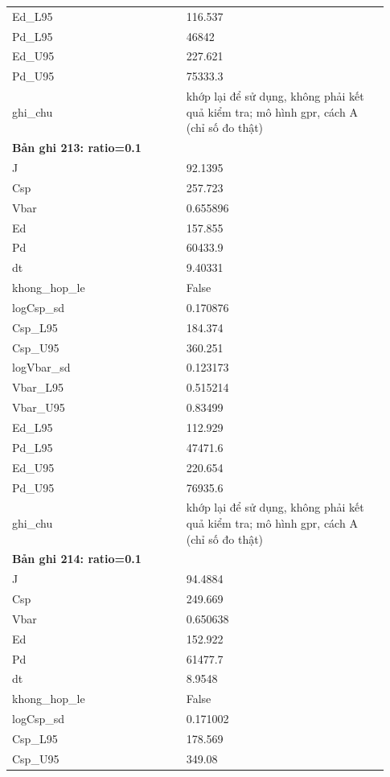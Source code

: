 \begin{longtable}{p{0.43\linewidth}p{0.50\linewidth}}
Ed\_\allowbreak L95 & 116.537 \\
Pd\_\allowbreak L95 & 46842 \\
Ed\_\allowbreak U95 & 227.621 \\
Pd\_\allowbreak U95 & 75333.3 \\
ghi\_\allowbreak chu & khớp lại để sử dụng, không phải kết quả kiểm tra; mô hình gpr, cách A (chỉ số đo thật) \\
\midrule
\multicolumn{2}{p{0.95\linewidth}}{\textbf{Bản ghi 213: ratio=0.1}} \\
J & 92.1395 \\
Csp & 257.723 \\
Vbar & 0.655896 \\
Ed & 157.855 \\
Pd & 60433.9 \\
dt & 9.40331 \\
khong\_\allowbreak hop\_\allowbreak le & False \\
logCsp\_\allowbreak sd & 0.170876 \\
Csp\_\allowbreak L95 & 184.374 \\
Csp\_\allowbreak U95 & 360.251 \\
logVbar\_\allowbreak sd & 0.123173 \\
Vbar\_\allowbreak L95 & 0.515214 \\
Vbar\_\allowbreak U95 & 0.83499 \\
Ed\_\allowbreak L95 & 112.929 \\
Pd\_\allowbreak L95 & 47471.6 \\
Ed\_\allowbreak U95 & 220.654 \\
Pd\_\allowbreak U95 & 76935.6 \\
ghi\_\allowbreak chu & khớp lại để sử dụng, không phải kết quả kiểm tra; mô hình gpr, cách A (chỉ số đo thật) \\
\midrule
\multicolumn{2}{p{0.95\linewidth}}{\textbf{Bản ghi 214: ratio=0.1}} \\
J & 94.4884 \\
Csp & 249.669 \\
Vbar & 0.650638 \\
Ed & 152.922 \\
Pd & 61477.7 \\
dt & 8.9548 \\
khong\_\allowbreak hop\_\allowbreak le & False \\
logCsp\_\allowbreak sd & 0.171002 \\
Csp\_\allowbreak L95 & 178.569 \\
Csp\_\allowbreak U95 & 349.08 \\

\end{longtable}
